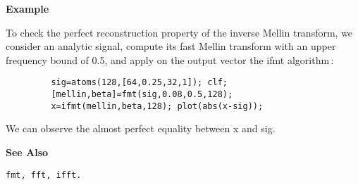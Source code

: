 {\bf \large {}\selectfont Example}\\
\hspace*{1.5cm}
\begin{minipage}[t]{13.5cm}
To check the perfect reconstruction property of the inverse Mellin
transform, we consider an analytic signal, compute its fast Mellin
transform with an upper frequency bound of 0.5, and apply on the output
vector the {\ty ifmt} algorithm\,:
\begin{verbatim}
         sig=atoms(128,[64,0.25,32,1]); clf;
         [mellin,beta]=fmt(sig,0.08,0.5,128); 
         x=ifmt(mellin,beta,128); plot(abs(x-sig));
\end{verbatim}
We can observe the almost perfect equality between {\ty x} and {\ty sig}. 
\end{minipage}
\vspace*{.5cm}


{\bf \large {}\selectfont See Also}\\
\hspace*{1.5cm}
\begin{minipage}[t]{13.5cm}
\begin{verbatim}
fmt, fft, ifft.
\end{verbatim}
\end{minipage}
